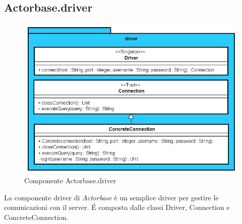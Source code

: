 \documentclass[a4paper]{article}
\begin{document}
	\subsection{Actorbase.driver}
		\begin{figure}[H]
			\centering
			\includegraphics[scale=0.5]{Driver/driverLevel.jpg}
			\caption{Componente Actorbase.driver}
		\end{figure}
		La componente driver di \emph{Actorbase} è un semplice driver per gestire le comunicazioni con il server. \'E composta dalle classi Driver, Connection e ConcreteConnection.
		
\end{document}

